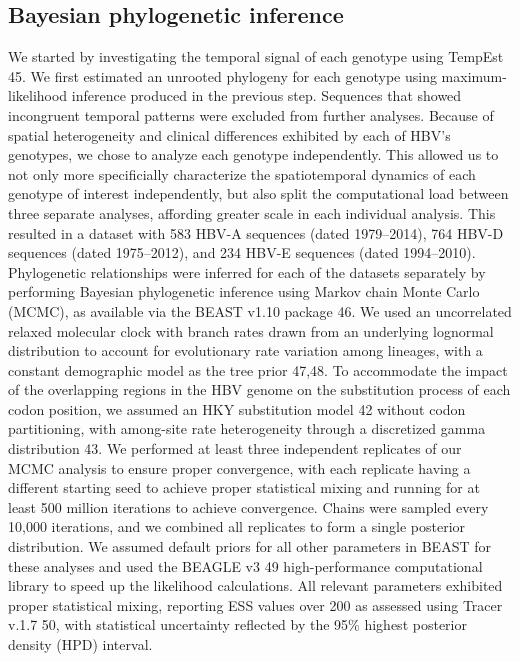 \subsection{Bayesian phylogenetic inference}
We started by investigating the temporal signal of each genotype using TempEst 45. We first estimated an unrooted phylogeny for each genotype using maximum-likelihood inference produced in the previous step. Sequences that showed incongruent temporal patterns were excluded from further analyses. Because of spatial heterogeneity and clinical differences exhibited by each of HBV's genotypes, we chose to analyze each genotype independently. This allowed us to not only more specificially characterize the spatiotemporal dynamics of each genotype of interest independently, but also split the computational load between three separate analyses, affording greater scale in each individual analysis. This resulted in a dataset with 583 HBV-A sequences (dated 1979--2014), 764 HBV-D sequences (dated 1975--2012), and 234 HBV-E sequences (dated 1994--2010). Phylogenetic relationships were inferred for each of the datasets separately by performing Bayesian phylogenetic inference using Markov chain Monte Carlo (MCMC), as available via the BEAST v1.10 package 46. We used an uncorrelated relaxed molecular clock with branch rates drawn from an underlying lognormal distribution to account for evolutionary rate variation among lineages, with a constant demographic model as the tree prior 47,48. To accommodate the impact of the overlapping regions in the HBV genome on the substitution process of each codon position, we assumed an HKY substitution model 42 without codon partitioning, with among-site rate heterogeneity through a discretized gamma distribution 43. We performed at least three independent replicates of our MCMC analysis to ensure proper convergence, with each replicate having a different starting seed to achieve proper statistical mixing and running for at least 500 million iterations to achieve convergence. Chains were sampled every 10,000 iterations, and we combined all replicates to form a single posterior distribution. We assumed default priors for all other parameters in BEAST for these analyses and used the BEAGLE v3 49 high-performance computational library to speed up the likelihood calculations. All relevant parameters exhibited proper statistical mixing, reporting ESS values over 200 as assessed using Tracer v.1.7 50, with statistical uncertainty reflected by the 95\% highest posterior density (HPD) interval.
